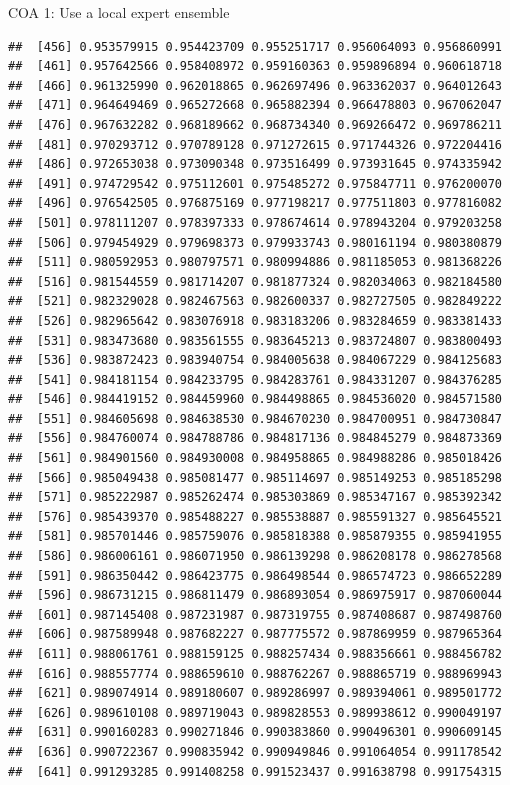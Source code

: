\documentclass[ignorenonframetext,]{beamer}
\begin{document}
\begin{frame}[fragile]{COA 1: Use a local expert ensemble}
\begin{verbatim}
##  [456] 0.953579915 0.954423709 0.955251717 0.956064093 0.956860991
##  [461] 0.957642566 0.958408972 0.959160363 0.959896894 0.960618718
##  [466] 0.961325990 0.962018865 0.962697496 0.963362037 0.964012643
##  [471] 0.964649469 0.965272668 0.965882394 0.966478803 0.967062047
##  [476] 0.967632282 0.968189662 0.968734340 0.969266472 0.969786211
##  [481] 0.970293712 0.970789128 0.971272615 0.971744326 0.972204416
##  [486] 0.972653038 0.973090348 0.973516499 0.973931645 0.974335942
##  [491] 0.974729542 0.975112601 0.975485272 0.975847711 0.976200070
##  [496] 0.976542505 0.976875169 0.977198217 0.977511803 0.977816082
##  [501] 0.978111207 0.978397333 0.978674614 0.978943204 0.979203258
##  [506] 0.979454929 0.979698373 0.979933743 0.980161194 0.980380879
##  [511] 0.980592953 0.980797571 0.980994886 0.981185053 0.981368226
##  [516] 0.981544559 0.981714207 0.981877324 0.982034063 0.982184580
##  [521] 0.982329028 0.982467563 0.982600337 0.982727505 0.982849222
##  [526] 0.982965642 0.983076918 0.983183206 0.983284659 0.983381433
##  [531] 0.983473680 0.983561555 0.983645213 0.983724807 0.983800493
##  [536] 0.983872423 0.983940754 0.984005638 0.984067229 0.984125683
##  [541] 0.984181154 0.984233795 0.984283761 0.984331207 0.984376285
##  [546] 0.984419152 0.984459960 0.984498865 0.984536020 0.984571580
##  [551] 0.984605698 0.984638530 0.984670230 0.984700951 0.984730847
##  [556] 0.984760074 0.984788786 0.984817136 0.984845279 0.984873369
##  [561] 0.984901560 0.984930008 0.984958865 0.984988286 0.985018426
##  [566] 0.985049438 0.985081477 0.985114697 0.985149253 0.985185298
##  [571] 0.985222987 0.985262474 0.985303869 0.985347167 0.985392342
##  [576] 0.985439370 0.985488227 0.985538887 0.985591327 0.985645521
##  [581] 0.985701446 0.985759076 0.985818388 0.985879355 0.985941955
##  [586] 0.986006161 0.986071950 0.986139298 0.986208178 0.986278568
##  [591] 0.986350442 0.986423775 0.986498544 0.986574723 0.986652289
##  [596] 0.986731215 0.986811479 0.986893054 0.986975917 0.987060044
##  [601] 0.987145408 0.987231987 0.987319755 0.987408687 0.987498760
##  [606] 0.987589948 0.987682227 0.987775572 0.987869959 0.987965364
##  [611] 0.988061761 0.988159125 0.988257434 0.988356661 0.988456782
##  [616] 0.988557774 0.988659610 0.988762267 0.988865719 0.988969943
##  [621] 0.989074914 0.989180607 0.989286997 0.989394061 0.989501772
##  [626] 0.989610108 0.989719043 0.989828553 0.989938612 0.990049197
##  [631] 0.990160283 0.990271846 0.990383860 0.990496301 0.990609145
##  [636] 0.990722367 0.990835942 0.990949846 0.991064054 0.991178542
##  [641] 0.991293285 0.991408258 0.991523437 0.991638798 0.991754315

\end{verbatim}
\end{frame}
\end{document}
